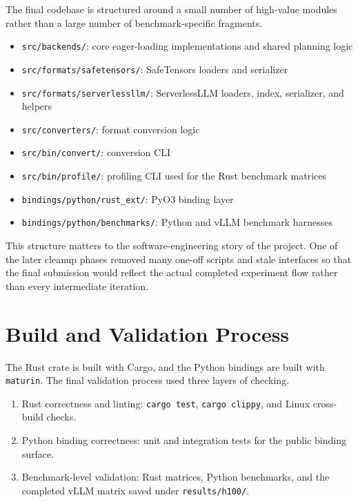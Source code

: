 The final codebase is structured around a small number of high-value modules rather than a large number of benchmark-specific fragments.

\begin{itemize}
\item \texttt{src/backends/}: core eager-loading implementations and shared planning logic
\item \texttt{src/formats/safetensors/}: SafeTensors loaders and serializer
\item \texttt{src/formats/serverlessllm/}: ServerlessLLM loaders, index, serializer, and helpers
\item \texttt{src/converters/}: format conversion logic
\item \texttt{src/bin/convert/}: conversion CLI
\item \texttt{src/bin/profile/}: profiling CLI used for the Rust benchmark matrices
\item \texttt{bindings/python/rust\_ext/}: PyO3 binding layer
\item \texttt{bindings/python/benchmarks/}: Python and vLLM benchmark harnesses
\end{itemize}

This structure matters to the software-engineering story of the project. One of the later cleanup phases removed many one-off scripts and stale interfaces so that the final submission would reflect the actual completed experiment flow rather than every intermediate iteration.

\section{Build and Validation Process}

The Rust crate is built with Cargo, and the Python bindings are built with \texttt{maturin}. The final validation process used three layers of checking.

\begin{enumerate}
\item Rust correctness and linting: \texttt{cargo test}, \texttt{cargo clippy}, and Linux cross-build checks.
\item Python binding correctness: unit and integration tests for the public binding surface.
\item Benchmark-level validation: Rust matrices, Python benchmarks, and the completed vLLM matrix saved under \texttt{results/h100/}.
\end{enumerate}

